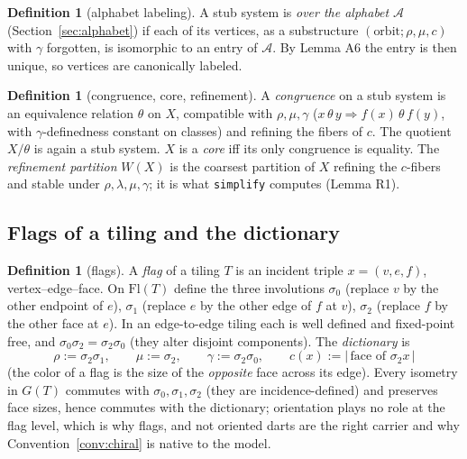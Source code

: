 \documentclass[11pt]{article}
\theoremstyle{definition}
\newtheorem{definition}[theorem]{Definition}
\newcommand{\Flags}{\mathrm{Fl}}
\newcommand{\A}{\mathcal{A}}
\begin{document}
\begin{definition}[alphabet labeling]\label{def:overalpha}
A stub system is \emph{over the alphabet} $\A$ (Section~\ref{sec:alphabet}) if each of
its vertices, as a substructure $(\text{orbit}; \rho, \mu, c)$ with $\gamma$ forgotten,
is isomorphic to an entry of $\A$. By Lemma A6 the entry is then unique, so vertices are
canonically labeled.
\end{definition}

\begin{definition}[congruence, core, refinement]\label{def:congruence}
A \emph{congruence} on a stub system is an equivalence relation $\theta$ on $X$,
compatible with $\rho, \mu, \gamma$ ($x \,\theta\, y \Rightarrow f(x)\,\theta\,f(y)$,
with $\gamma$-definedness constant on classes) and refining the fibers of $c$. The
quotient $X/\theta$ is again a stub system. $X$ is a \emph{core} iff its only congruence
is equality. The \emph{refinement partition} $W(X)$ is the coarsest partition of $X$
refining the $c$-fibers and stable under $\rho, \lambda, \mu, \gamma$; it is what
\texttt{simplify} computes (Lemma R1).
\end{definition}

\subsection{Flags of a tiling and the dictionary}

\begin{definition}[flags]\label{def:flags}
A \emph{flag} of a tiling $T$ is an incident triple $x = (v, e, f)$, vertex--edge--face.
On $\Flags(T)$ define the three involutions
$\sigma_0$ (replace $v$ by the other endpoint of $e$),
$\sigma_1$ (replace $e$ by the other edge of $f$ at $v$),
$\sigma_2$ (replace $f$ by the other face at $e$).
In an edge-to-edge tiling each is well defined and fixed-point free, and
$\sigma_0\sigma_2 = \sigma_2\sigma_0$ (they alter disjoint components). The
\emph{dictionary} is
\[
\rho := \sigma_2\sigma_1, \qquad
\mu := \sigma_2, \qquad
\gamma := \sigma_2\sigma_0, \qquad
c(x) := \bigl|\,\text{face of } \sigma_2 x\,\bigr|
\]
(the color of a flag is the size of the \emph{opposite} face across its edge). Every
isometry in $G(T)$ commutes with $\sigma_0, \sigma_1, \sigma_2$ (they are
incidence-defined) and preserves face sizes, hence commutes with the dictionary;
orientation plays no role at the flag level, which is why flags, and not oriented
darts are the right carrier and why Convention~\ref{conv:chiral} is native to the model.
\end{definition}
\end{document}

